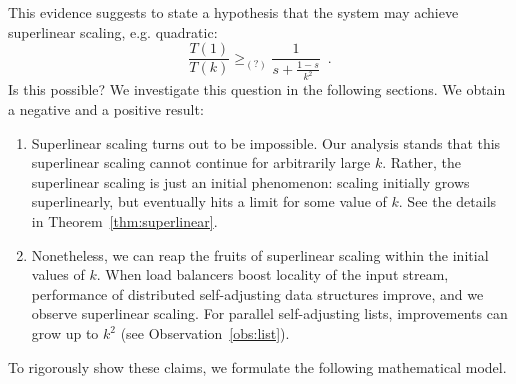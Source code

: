 This evidence suggests to state a hypothesis that the system may achieve superlinear scaling, e.g. quadratic:
\begin{equation}\label{eq:mtf-perf}
  \frac{T(1)}{T(k)} \ge_{(?)} \frac1{s + \frac{1-s}{k^2}} \enspace .
\end{equation}
Is this possible? We investigate this question in the following sections.
We obtain a negative and a positive result:
\begin{enumerate}
\item Superlinear scaling turns out to be impossible.
Our analysis  stands that this superlinear scaling cannot continue for arbitrarily large $k$.
Rather, the superlinear scaling is just an initial phenomenon: scaling initially grows superlinearly, but eventually hits a limit for some value of $k$. See the details in Theorem~\ref{thm:superlinear}.

\item
Nonetheless, we can reap the fruits of superlinear scaling within the initial values of $k$. When load balancers boost locality of the input stream, performance of distributed self-adjusting data structures improve, and we observe superlinear scaling. For parallel self-adjusting lists, improvements can grow up to $k^2$ (see Observation~\ref{obs:list}).
\end{enumerate}
To rigorously show these claims, we formulate the following mathematical model.






